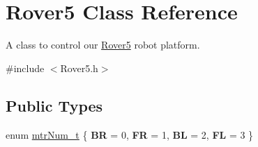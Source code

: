 \hypertarget{classRover5}{\section{Rover5 Class Reference}
\label{classRover5}
}


A class to control our \hyperlink{classRover5}{Rover5} robot platform.  




{\ttfamily \#include $<$Rover5.\-h$>$}

\subsection*{Public Types}
\begin{DoxyCompactItemize}
\item 
enum \hyperlink{classRover5_a7ab37bde98ed7f9626e8489e754b0afe}{mtr\-Num\-\_\-t} \{ {\bfseries B\-R} = 0, 
{\bfseries F\-R} = 1, 
{\bfseries B\-L} = 2, 
{\bfseries F\-L} = 3
 \}
\end{DoxyCompactItemize}
